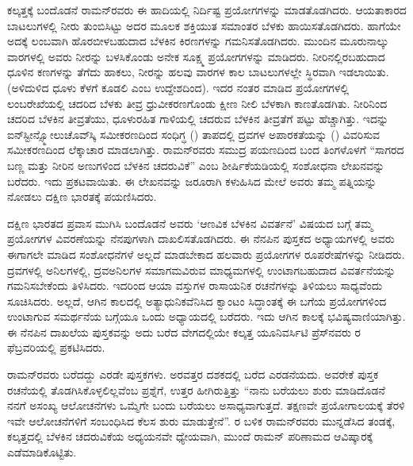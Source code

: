ಕಲ್ಕತ್ತಕ್ಕೆ ಬಂದೊಡನೆ ರಾಮನ್‍ರವರು ಈ ಹಾದಿಯಲ್ಲಿ ನಿರ್ದಿಷ್ಟ ಪ್ರಯೋಗಗಳನ್ನು ಮಾಡತೊಡಗಿದರು. ಆಯತಾಕಾರದ ಬಾಟಲುಗಳಲ್ಲಿ ನೀರು ತುಂಬಿಸಿಟ್ಟು ಅದರ ಮೂಲಕ ಶಕ್ತಿಯುತ ಸಮಾಂತರ ಬೆಳಕು ಹಾಯಿಸತೊಡಗಿದರು. ಹಾಗೆಯೇ ಅದಕ್ಕೆ ಲಂಬವಾಗಿ ಹೊರಬೀಳಬಹುದಾದ ಬೆಳಕಿನ ಕಿರಣಗಳನ್ನು ಗಮನಿಸತೊಡಗಿದರು. ಮುಂದಿನ ಮೂರು\enginline{-}ನಾಲ್ಕು ವಾರಗಳಲ್ಲಿ ಅವರು ನೀರನ್ನು ಬಳಸಿಕೊಂಡು ಅನೇಕ ಸೂಕ್ಷ್ಮ ಪ್ರಯೋಗಗಳನ್ನು ಮಾಡಿದರು. ನೀರಿನಲ್ಲಿರಬಹುದಾದ ಧೂಳಿನ ಕಣಗಳನ್ನು ತೆಗೆದು ಹಾಕಲು, ನೀರನ್ನು ಹಲವು ವಾರಗಳ ಕಾಲ ಬಾಟಲುಗಳಲ್ಲೇ ಸ್ಥಿರವಾಗಿ ಇಡಲಾಯಿತು. (ಅಳಿದುಳಿದ ಧೂಳು ಕೆಳಗೆ ಕೂಡಲಿ ಎಂಬ ಉದ್ದೇಶದಿಂದ). ಇದರ ನಂತರ ಮಾಡಿದ ಪ್ರಯೋಗಗಳಲ್ಲಿ ಲಂಬರೇಖೆಯಲ್ಲಿ ಚದರಿದ ಬೆಳಕು ತೀವ್ರ ಧ್ರುವೀಕರಣಗೊಂಡು ಕ್ಷೀಣ ನೀಲಿ ಬೆಳಕಾಗಿ ಕಾಣತೊಡಗಿತು. ನೀರಿನಿಂದ ಚದರಿದ ಬೆಳಕಿನ ತೀವ್ರತೆಯು, ಧೂಳುರಹಿತ ಗಾಳಿಯಲ್ಲಿ ಚದರುವ ಬೆಳಕಿನ ತೀವ್ರತೆಗೆ  ಪಟ್ಟು ಹೆಚ್ಚಾಗಿತ್ತು. ಇದನ್ನು ಐನ್‍ಸ್ಟೀನ್\enginline{-}ಸ್ಮೋಲುಚೊವ್‍ಸ್ಕಿ ಸಮೀಕರಣದಿಂದ ಸಂಧಿಗ್ಧ () ತಾಪದಲ್ಲಿ ದ್ರವಗಳ ಅಪಾರಕತೆಯನ್ನು () ವಿವರಿಸುವ ಸಮೀಕರಣದಿಂದ ಲೆಕ್ಕಾಚಾರ ಮಾಡಲಾಗಿತ್ತು. ರಾಮನ್‍ರವರು ಸಮುದ್ರ ಪಯಣದಿಂದ ಬಂದ ತಿಂಗಳೊಳಗೆ “ಸಾಗರದ ಬಣ್ಣ ಮತ್ತು ನೀರಿನ ಅಣುಗಳಿಂದ ಬೆಳಕಿನ ಚದರುವಿಕೆ”  ಎಂಬ ಶೀರ್ಷಿಕೆಯಡಿಯಲ್ಲಿ ಸಂಶೋಧನಾ ಲೇಖನವನ್ನು ಬರೆದರು. ಇದು \textit{}  ಪ್ರಕಟವಾಯಿತು. ಈ ಲೇಖನವನ್ನು ಜರೂರಾಗಿ ಕಳುಹಿಸಿದ ಮೇಲೆ ಅವರು ತಮ್ಮ ಪತ್ನಿಯನ್ನು ನೋಡಲು ದಕ್ಷಿಣ ಭಾರತಕ್ಕೆ ಪಯಣಿಸಿದರು.

\vskip 2pt

ದಕ್ಷಿಣ ಭಾರತದ ಪ್ರವಾಸ ಮುಗಿಸಿ ಬಂದೊಡನೆ ಅವರು ‘ಆಣವಿಕ ಬೆಳಕಿನ ವಿವರ್ತನೆ’  ವಿಷಯದ ಬಗ್ಗೆ ತಮ್ಮ ಪ್ರಯೋಗಗಳ ವಿವರಣೆಯನ್ನು ನೆನಪುಗಳಾಗಿ ದಾಖಲಿಸತೊಡಗಿದರು. ಈ ನೆನಪಿನ ಪುಸ್ತಕದ ಅಧ್ಯಾಯಗಳಲ್ಲಿ ಅವರು ಈಗಾಗಲೇ ಮಾಡಿದ ಸಂಶೋಧನೆಗಳೆ ಅಲ್ಲದೆ ಮಾಡಬೇಕಾದ ಹಲವಾರು ಪ್ರಯೋಗಗಳ ರೂಪರೇಷೆಗಳನ್ನು ನೀಡಿದರು. ದ್ರವಗಳಲ್ಲಿ ಅನಿಲಗಳಲ್ಲಿ, ದ್ರವ\enginline{-}ಅನಿಲಗಳ ಸಮಾಗಮವಿರುವ ಮಾಧ್ಯಮಗಳಲ್ಲಿ ಉಂಟಾಗಬಹುದಾದ ವಿವರ್ತನೆಯನ್ನು ಗಮನಿಸಬೇಕೆಂದು ತಿಳಿಸಿದರು. ಇದರಿಂದ ಆಯಾ ವಸ್ತುಗಳ ರಾಸಾಯನಿಕ ರಚನೆಗಳನ್ನು ತಿಳಿಯಲು ಸಾಧ್ಯವೆಂದು ಸೂಚಿಸಿದರು. ಅಲ್ಲದೆ, ಆಗಿನ ಕಾಲದಲ್ಲಿ ಅತ್ಯಾಧುನಿಕವೆನಿಸಿದ ಕ್ವಾಂಟಂ ಸಿದ್ಧಾಂತಕ್ಕೆ ಈ ಬಗೆಯ ಪ್ರಯೋಗಗಳಿಂದ ಉಂಟಾಗುವ ಸಮರ್ಥನೆಯ ಬಗ್ಗೆಯೂ ಒಂದು ಅಧ್ಯಾಯದಲ್ಲಿ ಬರೆದರು. ಇದು ಆಗಿನ ಕಾಲಕ್ಕೆ ಭವಿಷ್ಯವಾಣಿಯಾಗಿತ್ತು. ಈ ನೆನಪಿನ ದಾಖಲೆಯ ಪುಸ್ತಕವನ್ನು ಅದು ಬರೆದ ವೇಗದಲ್ಲಿಯೇ ಕಲ್ಕತ್ತ ಯೂನಿವರ್ಸಿಟಿ ಪ್ರೆಸ್‍ನವರು ರ ಫೆಬ್ರವರಿಯಲ್ಲಿ ಪ್ರಕಟಿಸಿದರು.

ರಾಮನ್‍ರವರು ಬರೆದದ್ದು ಎರಡೇ ಪುಸ್ತಕಗಳು. ಅರವತ್ತರ ದಶಕದಲ್ಲಿ ಬರೆದ \textit{} ಎರಡನೆಯದು. ಅವರೇಕೆ ಪುಸ್ತಕ ರಚನೆಯಲ್ಲಿ ತೊಡಗಿಸಿಕೊಳ್ಳಲಿಲ್ಲವೆಂಬ ಪ್ರಶ್ನೆಗೆ, ಉತ್ತರ ಹೀಗಿರುತ್ತಿತ್ತು\enginline{-} “ನಾನು ಬರೆಯಲು ಶುರು ಮಾಡಿದೊಡನೆ ನನಗೆ ಅಸಂಖ್ಯ ಆಲೋಚನೆಗಳು ಒಮ್ಮೆಗೇ ಬಂದು ಬರೆಯಲು ಅಸಾಧ್ಯವಾಗುತ್ತದೆ. ತಕ್ಷಣವೇ ಪ್ರಯೋಗಾಲಯಕ್ಕೆ ತೆರಳಿ ಇವೇ ಆಲೋಚನೆಗಳಿಗೆ ಸಂಬಂಧಿಸಿದ ಕೆಲಸ ಶುರು ಮಾಡುತ್ತೇನೆ”. ರ ಬಳಿಕ ರಾಮನ್‍ರವರು ಮುನ್ನಡೆಸಿದ ತಂಡಕ್ಕೆ, ಕಲ್ಕತ್ತದಲ್ಲಿ ಬೆಳಕಿನ ಚದರುವಿಕೆಯ ಅಧ್ಯಯನವೇ ಧ್ಯೇಯವಾಗಿ, ಮುಂದೆ ರಾಮನ್ ಪರಿಣಾಮದ ಆವಿಷ್ಕಾರಕ್ಕೆ ಎಡೆಮಾಡಿಕೊಟ್ಟಿತು.

